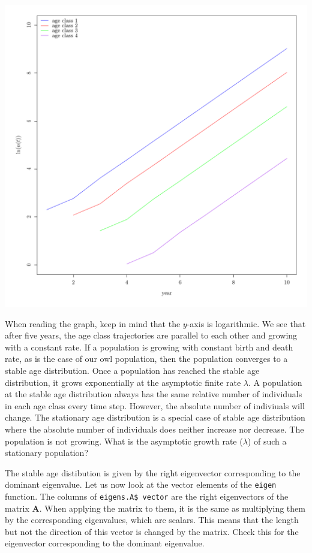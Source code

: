 \documentclass{article}\usepackage[]{graphicx}\usepackage[]{color}
\makeatletter
\def\maxwidth{ %
  \ifdim\Gin@nat@width>\linewidth
    \linewidth
  \else
    \Gin@nat@width
  \fi
}
\newenvironment{knitrout}{}{} %
\makeatother
\begin{document}
\begin{knitrout}
\color{fgcolor}
\includegraphics[width=\maxwidth]{figure/t3a-1} 

\end{knitrout}
When reading the graph, keep in mind that the $y$-axis is logarithmic. We see that after five years, the age class trajectories are parallel to each other and growing with a constant rate. If a population is growing with constant birth and death rate, as is the case of our owl population, then the population converges to a stable age distribution. Once a population has reached the stable age distribution, it grows exponentially at the asymptotic finite rate $\lambda$. A population at the stable age distribution always has the same relative number of individuals in each age class every time step. However, the absolute number of indiviuals will change. The stationary age distribution is a special case of stable age distribution where the absolute number of individuals does neither increase nor decrease. The population is not growing. What is the asymptotic growth rate ($\lambda$) of such a stationary population? 


The stable age distibution is given by the right eigenvector corresponding to the dominant eigenvalue. Let us now look at the vector elements of the \texttt{eigen} function. The columns of \texttt{eigens.A\$ vector} are the right eigenvectors of the matrix $\boldsymbol{A}$. When applying the matrix to them, it is the same as multiplying them by the corresponding eigenvalues, which are scalars. This means that the length but not the direction of this vector is changed by the matrix. Check this for the eigenvector corresponding to the dominant eigenvalue.
\end{document}
